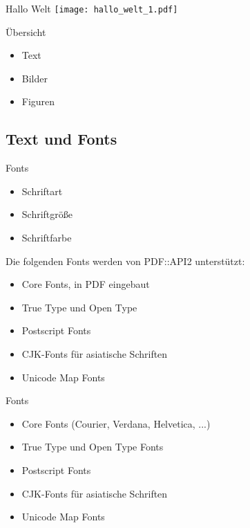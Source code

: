 \begin{frame}{Hallo Welt}
\texttt{[image: hallo\_welt\_1.pdf]}
\end{frame}


\begin{frame}{Übersicht}
\begin{itemize}
\item Text
\item Bilder
\item Figuren
\end{itemize}
\end{frame}

\subsection{Text und Fonts}

\begin{frame}{Fonts}
\begin{itemize}
\item Schriftart
\item Schriftgröße
\item Schriftfarbe
\end{itemize}
\end{frame}

Die folgenden Fonts werden von PDF::API2
unterstützt:


\begin{itemize}
\item Core Fonts, in PDF eingebaut
\item True Type und Open Type
\item Postscript Fonts
\item CJK-Fonts für asiatische Schriften
\item Unicode Map Fonts
\end{itemize}

\begin{frame}{Fonts}
\begin{itemize}
\item Core Fonts (Courier, Verdana, Helvetica, ...)
\item True Type und Open Type Fonts
\item Postscript Fonts
\item CJK-Fonts für asiatische Schriften
\item Unicode Map Fonts
\end{itemize}
\end{frame}

